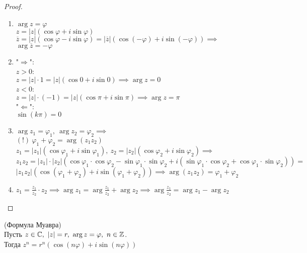 \begin{normalsize}
\begin{proof}
    \begin{enumerate}
        \item $\arg z = \varphi$\\
        $z = |z|(\cos\varphi + i\sin\varphi)$\\
        $\overline{z} = |z|(\cos\varphi - i\sin\varphi) = |\overline{z}|(\cos(-\varphi) + i\sin(-\varphi)) \implies$\\
        $\arg \overline{z} = -\varphi$

        \item 
        "$\Rightarrow$":\\
        $z > 0$: \\
        $z = |z| \cdot 1 = |z|(\cos 0 + i\sin 0) \implies \arg z = 0$\\
        $z < 0$: \\
        $z = |z| \cdot (-1) = |z|(\cos \pi + i\sin \pi) \implies \arg z = \pi$\\
        "$\Leftarrow$":\\
        $\sin(k \pi) = 0$

        \item $\arg z_1 = \varphi_1,~\arg z_2 = \varphi_2 \implies$\\
        $(!)~\varphi_1 + \varphi_2 = \arg(z_1 z_2)$\\
        $z_1 = |z_1|(\cos\varphi_1 + i\sin\varphi_1),~z_2 = |z_2|(\cos\varphi_2 + i\sin\varphi_2) \implies$\\
        $z_1 z_2 = |z_1| \cdot |z_2|(\cos\varphi_1 \cdot \cos\varphi_2 - \sin\varphi_1 \cdot \sin\varphi_2 + i(\sin\varphi_1 \cdot \cos\varphi_2 + \cos\varphi_1 \cdot \sin\varphi_2)) =$\\
        $|z_1 z_2|(\cos(\varphi_1 + \varphi_2) + i\sin(\varphi_1 + \varphi_2)) \implies \arg(z_1 z_2) = \varphi_1 + \varphi_2$

        \item $z_1 = \frac{z_1}{z_2} \cdot z_2 \implies \arg z_1 = \arg \frac{z_1}{z_2} + \arg z_2 \implies \arg \frac{z_1}{z_2} = \arg z_1 - \arg z_2$

    \end{enumerate}
\end{proof}

\begin{follow}(Формула Муавра)\\
    Пусть $z \in \mathbb{C},~|z| = r,~\arg z = \varphi,~n \in \mathbb{Z}$.\\
    Тогда $z^n = r^n(\cos(n\varphi) + i\sin(n\varphi))$
\end{follow}


\end{normalsize}
